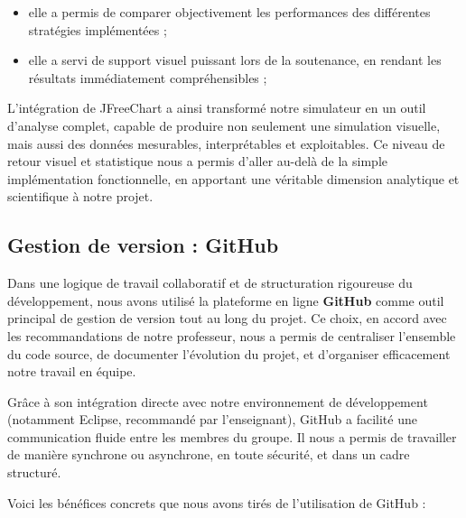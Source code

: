 \begin{itemize}
\begin{itemize}
        \item elle a permis de comparer objectivement les performances des différentes stratégies implémentées ;
        \item elle a servi de support visuel puissant lors de la soutenance, en rendant les résultats immédiatement compréhensibles ;
        
    \end{itemize}


    L’intégration de JFreeChart a ainsi transformé notre simulateur en un outil d’analyse complet, capable de produire non seulement une simulation visuelle, mais aussi des données mesurables, interprétables et exploitables. Ce niveau de retour visuel et statistique nous a permis d’aller au-delà de la simple implémentation fonctionnelle, en apportant une véritable dimension analytique et scientifique à notre projet.
\end{itemize}

\subsection{Gestion de version : GitHub}

Dans une logique de travail collaboratif et de structuration rigoureuse du développement, nous avons utilisé la plateforme en ligne \textbf{GitHub} comme outil principal de gestion de version tout au long du projet. Ce choix, en accord avec les recommandations de notre professeur, nous a permis de centraliser l’ensemble du code source, de documenter l’évolution du projet, et d’organiser efficacement notre travail en équipe.

Grâce à son intégration directe avec notre environnement de développement (notamment Eclipse, recommandé par l’enseignant), GitHub a facilité une communication fluide entre les membres du groupe. Il nous a permis de travailler de manière synchrone ou asynchrone, en toute sécurité, et dans un cadre structuré.

Voici les bénéfices concrets que nous avons tirés de l’utilisation de GitHub :

